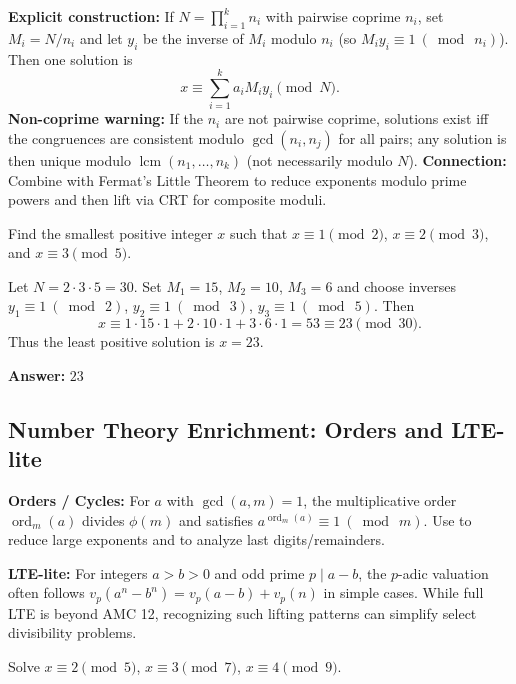 \documentclass[12pt]{article}
\newenvironment{problem}[1]
{\begin{tcolorbox}[colback=blue!5!white,colframe=blue!75!black,title={#1}]}{\end{tcolorbox}}
\newenvironment{solution}
{\begin{tcolorbox}[colback=green!5!white,colframe=green!75!black,title={Solution}]}{\end{tcolorbox}}
\begin{document}
\textbf{Explicit construction:} If $N = \prod_{i=1}^k n_i$ with pairwise coprime $n_i$, set $M_i = N/n_i$ and let $y_i$ be the inverse of $M_i$ modulo $n_i$ (so $M_i y_i \equiv 1 \ (\bmod\ n_i)$). Then one solution is
\[
 x \equiv \sum_{i=1}^k a_i M_i y_i \pmod{N}.
\]
\textbf{Non-coprime warning:} If the $n_i$ are not pairwise coprime, solutions exist iff the congruences are consistent modulo $\gcd(n_i,n_j)$ for all pairs; any solution is then unique modulo $\operatorname{lcm}(n_1,\ldots,n_k)$ (not necessarily modulo $N$).
\textbf{Connection:} Combine with Fermat's Little Theorem to reduce exponents modulo prime powers and then lift via CRT for composite moduli.

\begin{problem}{Example: Smallest Positive Solution}
Find the smallest positive integer $x$ such that $x \equiv 1 \pmod{2}$, $x \equiv 2 \pmod{3}$, and $x \equiv 3 \pmod{5}$.
\end{problem}

\begin{solution}
Let $N = 2\cdot 3\cdot 5 = 30$. Set $M_1 = 15$, $M_2 = 10$, $M_3 = 6$ and choose inverses $y_1 \equiv 1 \ (\bmod\ 2)$, $y_2 \equiv 1 \ (\bmod\ 3)$, $y_3 \equiv 1 \ (\bmod\ 5)$. Then
\[
 x \equiv 1\cdot 15\cdot 1 + 2\cdot 10\cdot 1 + 3\cdot 6\cdot 1 = 53 \equiv 23 \pmod{30}.
\]
Thus the least positive solution is $x = 23$.

\textbf{Answer:} $23$
\end{solution}

\subsection*{Number Theory Enrichment: Orders and LTE-lite}
\textbf{Orders / Cycles:} For $a$ with $\gcd(a,m)=1$, the multiplicative order $\operatorname{ord}_m(a)$ divides $\phi(m)$ and satisfies $a^{\operatorname{ord}_m(a)}\equiv 1\ (\bmod\ m)$. Use to reduce large exponents and to analyze last digits/remainders.

\textbf{LTE-lite:} For integers $a>b>0$ and odd prime $p\mid a-b$, the $p$-adic valuation often follows $v_p(a^n-b^n)=v_p(a-b)+v_p(n)$ in simple cases. While full LTE is beyond AMC 12, recognizing such lifting patterns can simplify select divisibility problems.

\begin{problem}{Example: Three Congruences}
Solve $x \equiv 2 \pmod{5}$, $x \equiv 3 \pmod{7}$, $x \equiv 4 \pmod{9}$.
\end{problem}
\end{document}
